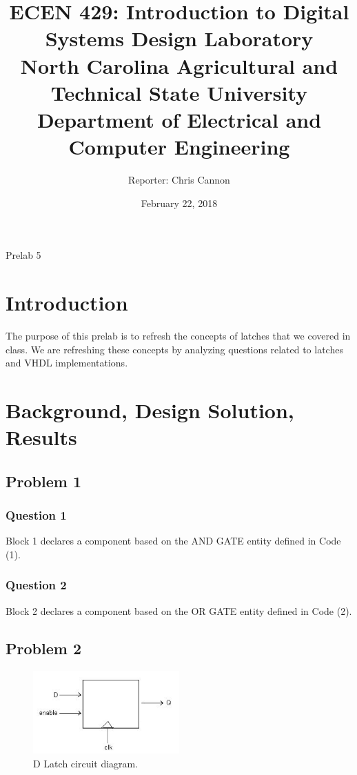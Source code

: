 \documentclass[11pt]{article}
\title {{\titleFont ECEN 429: Introduction to Digital Systems Design Laboratory \\ North Carolina Agricultural and Technical State University \\ Department of Electrical and Computer Engineering}} %
\author{\titleFont Reporter: Chris Cannon} %
\date{\titleFont February 22, 2018}
\begin{document}
\begin{titlingpage}
\maketitle
\begin{center}
	Prelab 5
\end{center}
\end{titlingpage}

\section{Introduction}
The purpose of this prelab is to refresh the concepts of latches that we covered in class. We are refreshing these concepts by analyzing questions related to latches and VHDL implementations.

\section{Background, Design Solution, Results}
\subsection{Problem 1}

\subsubsection{Question 1}
Block 1 declares a component based on the AND GATE entity defined in Code (1).

\subsubsection{Question 2}
Block 2 declares a component based on the OR GATE entity defined in Code (2).

\subsection{Problem 2}
\begin{figure}
\begin{center}
	\includegraphics[width=0.5\textwidth]{./img5_1.png}
	\caption{\label{fig:dLatch}D Latch circuit diagram.}
\end{center}
\end{figure}
\end{document}
